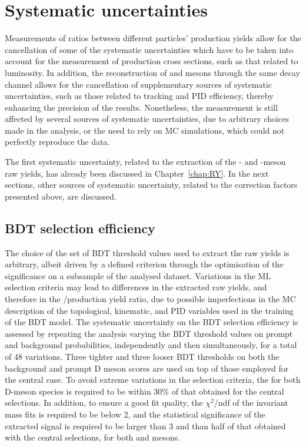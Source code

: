 \section{Systematic uncertainties}
Measurements of ratios between different particles' production yields allow for the cancellation of some of the systematic uncertainties which have to be taken into account for the measurement of production cross sections, such as that related to luminosity. In addition, the reconstruction of \ds and \dpl mesons through the same decay channel allows for the cancellation of supplementary sources of systematic uncertainties, such as those related to tracking and PID efficiency, thereby enhancing the precision of the results. Nonetheless, the measurement is still affected by several sources of systematic uncertainties, due to arbitrary choices made in the analysis, or the need to rely on MC simulations, which could not perfectly reproduce the data. 

The first systematic uncertainty, related to the extraction of the \ds- and \dpl-meson raw yields, has already been discussed in Chapter~\ref{chap:RY}. In the next sections, other sources of systematic uncertainty, related to the correction factors presented above, are discussed.

\subsection{BDT selection efficiency}\label{sec:BDT_syst}
The choice of the set of BDT threshold values used to extract the raw yields is arbitrary, albeit driven by a defined criterion through the optimisation of the significance on a subsample of the analysed dataset. Variations in the ML selection criteria may lead to differences in the extracted raw yields, and therefore in the \ds/\dpl production yield ratio, due to possible imperfections in the MC description of the topological, kinematic, and PID variables used in the training of the BDT model. The systematic uncertainty on the BDT selection efficiency is assessed by repeating the analysis varying the BDT threshold values on prompt and background probabilities, independently and then simultaneously, for a total of 48 variations. Three tighter and three looser BDT thresholds on both the background and prompt D meson scores are used on top of those employed for the central case. To avoid extreme variations in the selection criteria, the \aeffp for both D-meson species is required to be within 30\% of that obtained for the central selections. In addition, to ensure a good fit quality, the $\chi^2$/ndf of the invariant mass fits is required to be below 2, and the statistical significance of the extracted signal is required to be larger than 3 and than half of that obtained with the central selections, for both \ds and \dpl mesons. 


